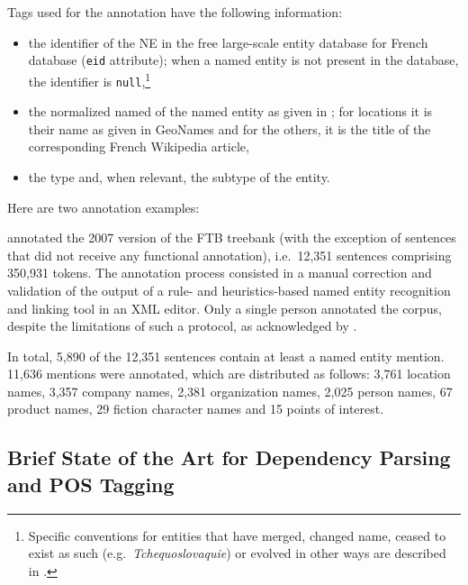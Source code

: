 Tags used for the annotation have the following information:
\begin{itemize}
    \item the identifier of the NE in the free large-scale entity database for French \aleda database \citep{sagot-stern-2012-aleda} (\texttt{eid} attribute); when a named entity is not present in the database, the identifier is \texttt{null},\footnote{Specific conventions for entities that have merged, changed name, ceased to exist as such (e.g.~\emph{Tchequoslovaquie}) or evolved in other ways are described in \citet{sagot-etal-2012-annotation}.}
    \item the normalized named of the named entity as given in \aleda; for locations it is their name as given in GeoNames and for the others, it is the title of the corresponding French Wikipedia article,
    \item the type and, when relevant, the subtype of the entity.
\end{itemize}
Here are two annotation examples:\\

\citet{sagot-etal-2012-annotation} annotated the 2007 version of the FTB treebank (with the exception of sentences that did not receive any functional annotation), i.e.~12,351 sentences comprising 350,931 tokens. The annotation process consisted in a manual correction and validation of the output of a rule- and heuristics-based named entity recognition and linking tool in an XML editor.
Only a single person annotated the corpus, despite the limitations of such a protocol, as acknowledged by \citet{sagot-etal-2012-annotation}.

In total, 5,890 of the 12,351 sentences contain at least a named entity mention. 11,636 mentions were annotated, which are distributed as follows: 3,761 location names, 3,357 company names, 2,381 organization names, 2,025 person names, 67 product names, 29 fiction character names and 15 points of interest.

\subsection{Brief State of the Art for Dependency Parsing and POS Tagging}

